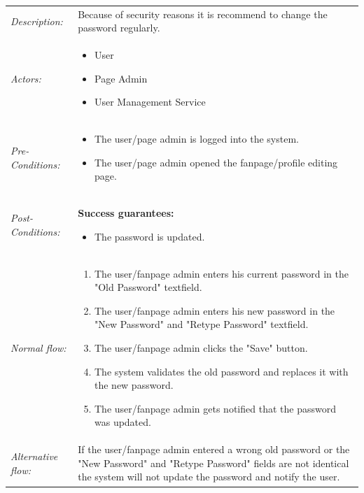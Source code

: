 \documentclass[11pt,a4paper]{report}
\begin{document}
\begin{longtable}{p{} | p{}}
        \hline
        \emph{Description:} & Because of security reasons it is recommend to change the password regularly.\\
        \emph{Actors:} & 
            \begin{itemize} 
                \item User
                \item Page Admin
                \item User Management Service
             \end{itemize} \\
        \emph{Pre-Conditions:} & 
            \begin{itemize} 
                \item The user/page admin is logged into the system.
                \item The user/page admin opened the fanpage/profile editing page.
             \end{itemize} \\
        \emph{Post-Conditions:} & \textbf{Success guarantees:} 
            \begin{itemize} 
                \item The password is updated. 
            \end{itemize} \\
        \emph{Normal flow:} & 
            \begin{enumerate} 
                \item The user/fanpage admin enters his current password in the "Old Password" textfield.
                \item The user/fanpage admin enters his new password in the "New Password" and "Retype Password" textfield.
                \item The user/fanpage admin clicks the "Save" button.
                \item The system validates the old password and replaces it with the new password.
                \item The user/fanpage admin gets notified that the password was updated.
             \end{enumerate} \\
        \emph{Alternative flow:} & If the user/fanpage admin entered a wrong old password or the "New Password" and "Retype Password" fields are not identical the system will not update the password and notify the user.\\ 
             \hline
\end{longtable}
\end{document}
